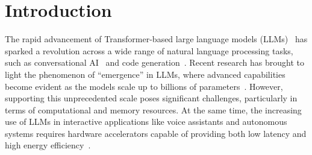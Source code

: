 \section{Introduction}
\label{sec:intro}
The rapid advancement of Transformer-based large language models (LLMs)~\cite{vaswani2017transformer,rishi2021foundation} has sparked a revolution across a wide range of natural language processing tasks, such as conversational AI~\cite{openai2023gpt4,zheng2023chatbotarena,cohen2022lamda} and code generation~\cite{chen2021codex,li2022alphacode,nijkamp2023codegen}. %
Recent research has brought to light the phenomenon of ``emergence'' in LLMs, where advanced capabilities become evident as the models scale up to billions of parameters~\cite{wei2022emergence,wei2022cot}. 
However, supporting this unprecedented scale poses significant challenges, particularly in terms of computational and memory resources.
At the same time, the increasing use of LLMs in interactive applications like voice assistants and autonomous systems requires hardware accelerators capable of providing both low latency and high energy efficiency~\cite{openai2023gpt4,driess2023palme,pope2022googleinf}.

